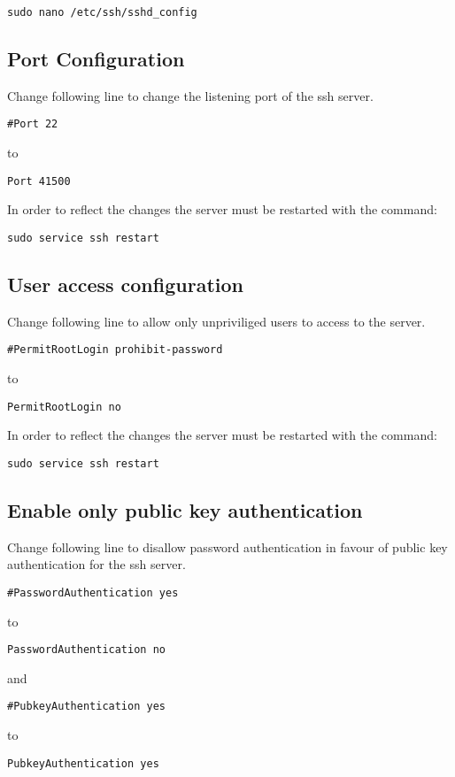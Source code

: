 \documentclass[10pt,a4paper]{article}
\begin{document}
\begin{verbatim}
sudo nano /etc/ssh/sshd_config
\end{verbatim}

\subsection{Port Configuration}
Change following line to change the listening port of the ssh server.

\begin{verbatim}
#Port 22
\end{verbatim}
to
\begin{verbatim}
Port 41500
\end{verbatim}

In order to reflect the changes the server must be restarted with the command:
\begin{verbatim}
sudo service ssh restart
\end{verbatim}

\subsection{User access configuration}
Change following line to allow only unpriviliged users to access to the server.

\begin{verbatim}
#PermitRootLogin prohibit-password
\end{verbatim}
to
\begin{verbatim}
PermitRootLogin no
\end{verbatim}

In order to reflect the changes the server must be restarted with the command:
\begin{verbatim}
sudo service ssh restart
\end{verbatim}

\subsection{Enable only public key authentication}
Change following line to disallow password authentication in favour of public key authentication for the ssh server.

\begin{verbatim}
#PasswordAuthentication yes
\end{verbatim}
to
\begin{verbatim}
PasswordAuthentication no
\end{verbatim}
and
\begin{verbatim}
#PubkeyAuthentication yes
\end{verbatim}
to
\begin{verbatim}
PubkeyAuthentication yes
\end{verbatim}
\end{document}
